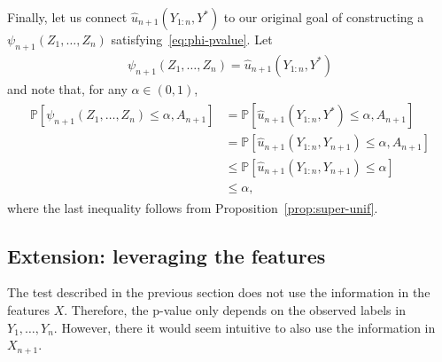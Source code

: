 \documentclass[11pt]{article}
\renewcommand{\P}[1]{\mathbb{P}\left[#1\right]}
\begin{document}
Finally, let us connect $\hat{u}_{n+1}(Y_{1:n}, Y^*)$ to our original goal of constructing a $\psi_{n+1}(Z_1, \ldots, Z_n)$ satisfying~\eqref{eq:phi-pvalue}.
Let 
\begin{align*}
  \psi_{n+1}(Z_1, \ldots, Z_n) = \hat{u}_{n+1}(Y_{1:n}, Y^*)
\end{align*}
and note that, for any $\alpha \in (0,1)$,
\begin{align} \label{eq:validity-pval}
\begin{split}
  \P{\psi_{n+1}(Z_1, \ldots, Z_n) \leq \alpha, A_{n+1}}
  & = \P{\hat{u}_{n+1}(Y_{1:n}, Y^*)  \leq \alpha, A_{n+1}} \\
  & = \P{\hat{u}_{n+1}(Y_{1:n}, Y_{n+1})  \leq \alpha, A_{n+1}} \\
  & \leq \P{\hat{u}_{n+1}(Y_{1:n}, Y_{n+1})  \leq \alpha} \\
  & \leq \alpha,
\end{split}
\end{align}
where the last inequality follows from Proposition~\ref{prop:super-unif}.

\subsection{Extension: leveraging the features} \label{sec:pval-extension-features}

The test described in the previous section does not use the information in the features $X$. 
Therefore, the p-value only depends on the observed labels in $Y_1, \ldots, Y_n$.
However, there it would seem intuitive to also use the information in $X_{n+1}$.
\end{document}
